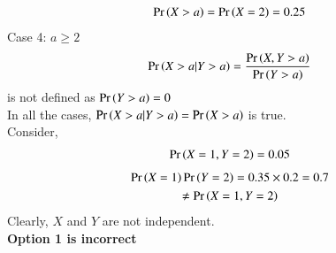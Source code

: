 \documentclass[journal,12pt,twocolumn]{IEEEtran}
\begin{document}
\begin{enumerate}
\begin{align}
        \Pr\left(X>a\right)=\Pr\left(X=2\right)=0.25
    \end{align}
    Case 4: $a\geq 2$
    \begin{align}
        \Pr\left(X>a|Y>a\right)=\frac{\Pr\left(X,Y>a\right)}{\Pr\left(Y>a\right)}
    \end{align}
    is not defined as $\Pr\left(Y>a\right)=0$\\
    In all the cases, $\Pr\left(X>a|Y>a\right)=\Pr\left(X>a\right)$ is true.\\
    Consider,
    \begin{align}
        \Pr\left(X=1,Y=2\right)=0.05
    \end{align}
    \begin{multline}
        \Pr\left(X=1\right)\Pr\left(Y=2\right)=0.35\times0.2=0.7\\\neq\Pr\left(X=1,Y=2\right)
    \end{multline} 
    Clearly, $X$ and $Y$ are not independent. \\
    \textbf{Option 1 is incorrect}
    

\end{enumerate}
\end{document}
